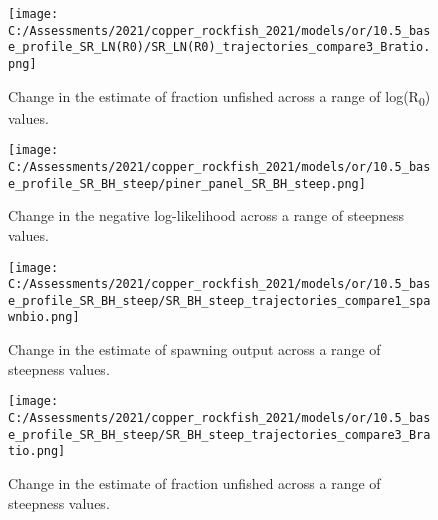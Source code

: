 \documentclass[11pt,
  english,
  a4paper,
]{article}
\begin{document}
\tagmcend\tagstructend


\begin{figure}
\centering
\texttt{[image: C:/Assessments/2021/copper\_rockfish\_2021/models/or/10.5\_base\_profile\_SR\_LN(R0)/SR\_LN(R0)\_trajectories\_compare3\_Bratio.png]}
\caption{Change in the estimate of fraction unfished across a range of log(R\textsubscript{0}) values.\label{fig:r0-depl}}
\end{figure}

\tagmcend\tagstructend


\begin{figure}
\centering
\texttt{[image: C:/Assessments/2021/copper\_rockfish\_2021/models/or/10.5\_base\_profile\_SR\_BH\_steep/piner\_panel\_SR\_BH\_steep.png]}
\caption{Change in the negative log-likelihood across a range of steepness values.\label{fig:h-profile}}
\end{figure}

\tagmcend\tagstructend


\begin{figure}
\centering
\texttt{[image: C:/Assessments/2021/copper\_rockfish\_2021/models/or/10.5\_base\_profile\_SR\_BH\_steep/SR\_BH\_steep\_trajectories\_compare1\_spawnbio.png]}
\caption{Change in the estimate of spawning output across a range of steepness values.\label{fig:h-ssb}}
\end{figure}

\tagmcend\tagstructend


\begin{figure}
\centering
\texttt{[image: C:/Assessments/2021/copper\_rockfish\_2021/models/or/10.5\_base\_profile\_SR\_BH\_steep/SR\_BH\_steep\_trajectories\_compare3\_Bratio.png]}
\caption{Change in the estimate of fraction unfished across a range of steepness values.\label{fig:h-depl}}
\end{figure}

\tagmcend\tagstructend

\end{document}
